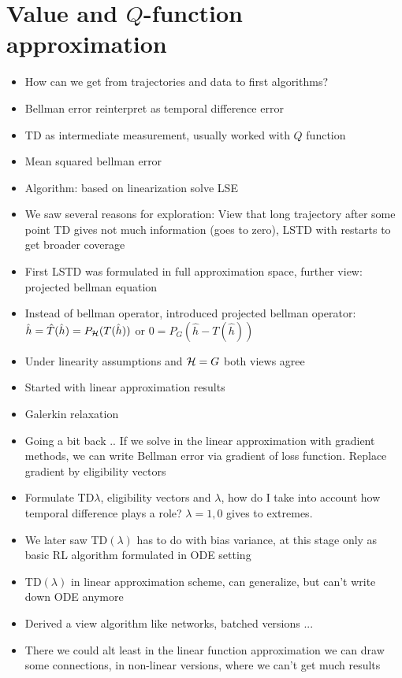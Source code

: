 \section{Value and \(Q\)-function approximation}
\begin{itemize}
    \item How can we get from trajectories and data to first algorithms?
    \item Bellman error reinterpret as temporal difference error
    \item TD as intermediate measurement, usually worked with \(Q\) function
    \item Mean squared bellman error 
    \item Algorithm: based on linearization solve LSE
    \item We saw several reasons for exploration: View that long trajectory after some point TD gives not much information (goes to zero), LSTD with restarts to get broader coverage 
    \item First LSTD was formulated in full approximation space, further view: projected bellman equation 
    \item Instead of bellman operator, introduced projected bellman operator: $\hat{h}=\hat{T}(\hat{h})=P_{\mathcal{H}}(T(\hat{h}))$ or \(0=P_G(\hat{h}-T(\hat{h}))\)
    \item Under linearity assumptions and $\mathcal{H}=G$ both views agree
    \item Started with linear approximation results
    \item Galerkin relaxation
    \item Going a bit back .. If we solve in the linear approximation with gradient methods, we can write Bellman error via gradient of loss function. Replace gradient by eligibility vectors    
    \item Formulate TD\(\lambda\), eligibility vectors and \(\lambda\), how do I take into account how temporal difference plays a role? \(\lambda=1,0\) gives to extremes.
    \item We later saw TD\((\lambda)\) has to do with bias variance, at this stage only as basic RL algorithm formulated in ODE setting 
    \item TD\((\lambda)\) in linear approximation scheme, can generalize, but can't write down ODE anymore 
    \item Derived a view algorithm like networks, batched versions ... 
    \item There we could alt least in the linear function approximation we can draw some connections, in non-linear versions, where we can't get much results 

\end{itemize}
